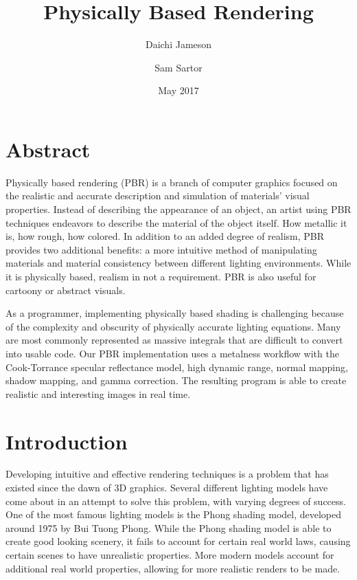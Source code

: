 \documentclass[12pt, letterpaper, twocolumn]{article}
\title{Physically Based Rendering}
\author{Daichi Jameson \and Sam Sartor}
\date{May 2017}
\begin{document}
\begin{titlepage}
\maketitle
\end{titlepage}
 
\section{Abstract}

Physically based rendering (PBR) is a branch of computer graphics focused on
the realistic and accurate description and simulation of materials’ visual
properties. Instead of describing the appearance of an object, an artist using
PBR techniques endeavors to describe the material of the object itself. How
metallic it is, how rough, how colored. In addition to an added degree of
realism, PBR provides two additional benefits: a more intuitive method of
manipulating materials and material consistency between different lighting
environments\cite{lerpGL}. While it is physically based, realism in not a
requirement. PBR is also useful for cartoony or abstract visuals.

As a programmer, implementing physically based shading is challenging because
of the complexity and obscurity of physically accurate lighting equations.
Many are most commonly represented as massive integrals that are difficult to
convert into usable code. Our PBR implementation uses a metalness workflow
with the Cook-Torrance specular reflectance model, high dynamic range, normal
mapping, shadow mapping, and gamma correction. The resulting program is able
to create realistic and interesting images in real time.

\section{Introduction}

Developing intuitive and effective rendering techniques is a problem that has
existed since the dawn of 3D graphics. Several different lighting models have
come about in an attempt to solve this problem, with varying degrees of
success. One of the most famous lighting models is the Phong shading model,
developed around 1975 by Bui Tuong Phong\cite{panini}. While the Phong
shading model is able to create good looking scenery, it fails to account for
certain real world laws, causing certain scenes to have unrealistic
properties. More modern models account for additional real world properties,
allowing for more realistic renders to be made.
 
\end{document}
